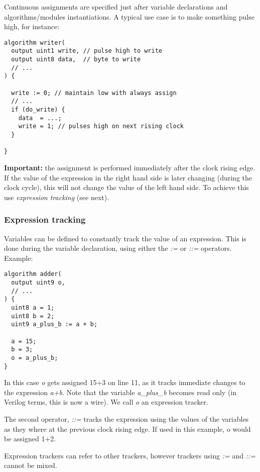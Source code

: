 \documentclass[a4]{article}
\begin{document}
Continuous assignments are specified just after variable declarations and algorithms/modules instantiations. A typical use case is to make something pulse high, for instance:

\begin{verbatim}
algorithm writer(
  output uint1 write, // pulse high to write
  output uint8 data,  // byte to write
  // ...
) {

  write := 0; // maintain low with always assign
  // ...
  if (do_write) {
    data  = ...;
    write = 1; // pulses high on next rising clock
  }
  
}
\end{verbatim}


\textbf{Important:} the assignment is performed immediately after the clock rising edge. If the value of the expression in the right hand side is later changing (during the clock cycle), this will not change the value of the left hand side.
To achieve this use \textit{expression tracking} (see next).

\subsubsection{Expression tracking}
\label{sec:exprtrack}

Variables can be defined to constantly track the value of an expression. This is done during the variable declaration, using either the \textit{:=} or \textit{::=} operators. Example:

\begin{verbatim}
algorithm adder(
  output uint9 o,
  // ...
) {
  uint8 a = 1;
  uint8 b = 2;
  uint9 a_plus_b := a + b;
  
  a = 15;
  b = 3;
  o = a_plus_b;
}
\end{verbatim}

In this case \textit{o} gets assigned 15+3 on line 11, as it tracks immediate changes to the expression \textit{a+b}. Note that the variable \textit{a\_plus\_b} becomes read only (in Verilog terms, this is now a wire). We call \textit{o} an expression tracker.

The second operator, \textit{::=} tracks the expression using the values of the variables as they where at the previous clock rising edge. If used in this example, o would be assigned 1+2.

Expression trackers can refer to other trackers, however trackers using \textit{:=} and \textit{::=} cannot be mixed.
\end{document}
